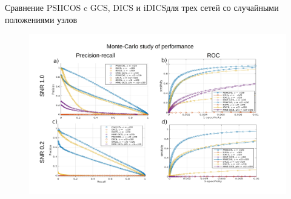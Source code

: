 \documentclass[12pt]{beamer}
\begin{document}
\begin{frame}{Сравнение PSIICOS c GCS, DICS и iDICS}{для трех сетей со случайными положениями узлов}
 \begin{figure}[!ht]
 \includegraphics[width=1\textwidth]{../images/psiicos_paper/Figure4_hr_labelled_pans.jpg}
\end{figure}%
\end{frame}


\end{document}
